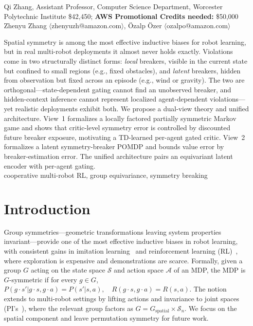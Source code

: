 \documentclass[11pt]{article}
\begin{document}

 Qi Zhang, Assistant Professor, Computer Science Department, Worcester Polytechnic Institute
 \$42,450; \qquad
{\bf AWS Promotional Credits needed:} \$50,000\\
Zhenyu Zhang $\langle$zhenyuzh@amazon.com$\rangle$,
Özalp Özer $\langle$ozalpo@amazon.com$\rangle$

Spatial symmetry is among the most effective inductive biases for robot learning, but in real multi-robot deployments it almost never holds exactly. Violations come in two structurally distinct forms: \emph{local} breakers, visible in the current state but confined to small regions (e.g., fixed obstacles), and \emph{latent} breakers, hidden from observation but fixed across an episode (e.g., wind or gravity). The two are orthogonal—state-dependent gating cannot find an unobserved breaker, and hidden-context inference cannot represent localized agent-dependent violations—yet realistic deployments exhibit both. We propose a dual-view theory and unified architecture. View~1 formalizes a locally factored partially symmetric Markov game and shows that critic-level symmetry error is controlled by discounted future breaker exposure, motivating a TD-learned per-agent gated critic. View~2 formalizes a latent symmetry-breaker POMDP and bounds value error by breaker-estimation error. The unified architecture pairs an equivariant latent encoder with per-agent gating.\\
cooperative multi-robot RL, group equivariance, symmetry breaking


\section{Introduction}
Group symmetries—geometric transformations leaving system properties invariant—provide one of the most effective inductive biases in robot learning, with consistent gains in imitation learning~\citep{zeng2021transporter,wang2024equivariantdiffusion,seo2025survey} and reinforcement learning (RL)~\citep{vanderpol2020mdp,wang2022so2,luo2024reinforcement}, where exploration is expensive and demonstrations are scarce.
Formally, given a group $G$ acting on the state space $\mathcal{S}$ and action space $\mathcal{A}$ of an MDP, the MDP is $G$-symmetric if for every $g\in G$,
$
P(g \cdot s' | g \cdot s, g \cdot a) = P(s' | s, a), \quad R(g \cdot s, g \cdot a) = R(s, a)
$.
The notion extends to multi-robot settings by lifting actions and invariance to joint spaces (PI's~\citep{chen20243}), where the relevant group factors as $G = G_{\text{spatial}} \times \mathcal{S}_n$. We focus on the spatial component and leave permutation symmetry for future work.
\end{document}

